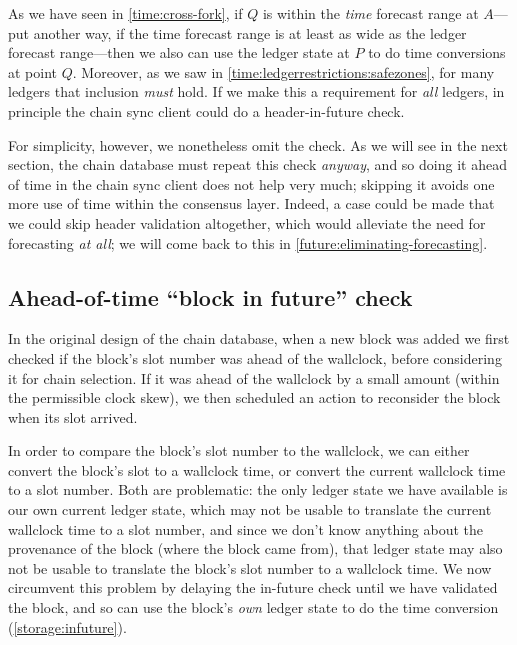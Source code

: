 \begin{center}
\end{center}

As we have seen in \cref{time:cross-fork}, if $Q$ is within the \emph{time}
forecast range at $A$---put another way, if the time forecast range is at least
as wide as the ledger forecast range---then we also can use the ledger state at
$P$ to do time conversions at point $Q$. Moreover, as we saw in
\cref{time:ledgerrestrictions:safezones}, for many ledgers that inclusion
\emph{must} hold. If we make this a requirement for \emph{all} ledgers, in
principle the chain sync client could do a header-in-future check.

For simplicity, however, we nonetheless omit the check. As we will see in the
next section, the chain database must repeat this check \emph{anyway}, and so
doing it ahead of time in the chain sync client does not help very much;
skipping it avoids one more use of time within the consensus layer. Indeed, a
case could be made that we could skip header validation altogether, which would
alleviate the need for forecasting \emph{at all}; we will come back to this in
\cref{future:eliminating-forecasting}.

\subsection{Ahead-of-time ``block in future'' check}
\label{time:block-infuture-check}

In the original design of the chain database, when a new block was added we
first checked if the block's slot number was ahead of the wallclock, before
considering it for chain selection. If it was ahead of the wallclock by a small
amount (within the permissible clock skew), we then scheduled an action to
reconsider the block when its slot arrived.

In order to compare the block's slot number to the wallclock, we can either
convert the block's slot to a wallclock time, or convert the current wallclock
time to a slot number. Both are problematic: the only ledger state we have
available is our own current ledger state, which may not be usable to translate
the current wallclock time to a slot number, and since we don't know anything
about the provenance of the block (where the block came from), that ledger state
may also not be usable to translate the block's slot number to a wallclock
time. We now circumvent this problem by delaying the in-future check until we
have validated the block, and so can use the block's \emph{own} ledger state to
do the time conversion (\cref{storage:infuture}).

